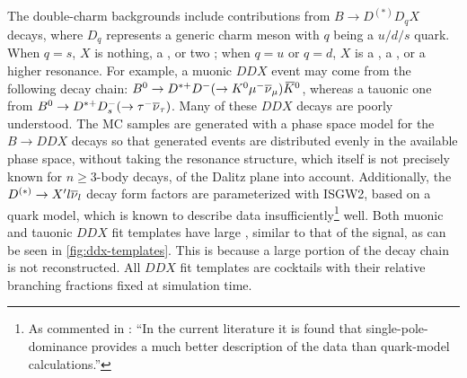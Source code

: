 The double-charm backgrounds include contributions from
$B \rightarrow D^{(*)} D_q X$ decays,
where $D_q$ represents a generic charm meson with $q$ being a $u/d/s$ quark.
When $q = s$,
$X$ is nothing, a \pion, or two \pion;
when $q = u$ or $q = d$,
$X$ is a \kaon, a \Kstar, or a higher \Kstar resonance.
For example, a muonic $DDX$ event may come from the following decay chain:
${{B}^0} \rightarrow {\ensuremath{{D}^{*+}}} {\ensuremath{{D}^-}} (\rightarrow {\ensuremath{{K}^0}}{\ensuremath{\mu^-}}{\ensuremath{{\overline{\nu}}_\mu}}) {{\kern 0.18em\overline{\kern -0.18em K}}{}^0}$,
whereas a tauonic one from
${{B}^0} \rightarrow {\ensuremath{{D}^{*+}}} {\ensuremath{{D}^-_{s}}} (\rightarrow {\ensuremath{\tau^-}}{\ensuremath{{\overline{\nu}}_\tau}})$.
Many of these $DDX$ decays are poorly understood.
The MC samples are generated with a phase space model for the
$B \rightarrow DDX$ decays so that generated events are
distributed evenly in the available phase space,
without taking the resonance structure,
which itself is not precisely known for $n \geq 3$-body decays,
of the Dalitz plane into account.
Additionally, the $D^{(*)} \rightarrow X' l{{\overline{\nu}}_l}$ decay form factors are
parameterized with ISGW2, based on a quark model,
which is known to describe data insufficiently\footnote{
    As commented in \cite{LHCb-ANA-2020-056}:
    ``In the current literature it is found that single-pole-dominance provides
    a much better description of the data than quark-model calculations.''
} well.
Both muonic and tauonic $DDX$ fit templates have large \mmSq,
similar to that of the signal,
as can be seen in \cref{fig:ddx-templates}.
This is because a large portion of the decay chain is not reconstructed.
All $DDX$ fit templates are cocktails with their relative branching fractions
fixed at simulation time.

